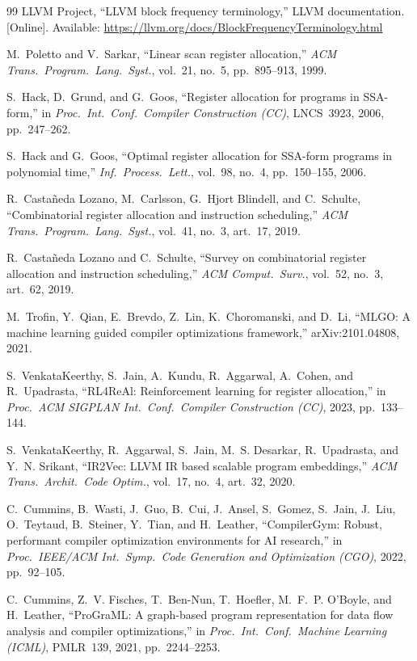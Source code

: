 \documentclass{ieeeaccess}
\begin{document}
\begin{thebibliography}{99}
LLVM Project, ``LLVM block frequency terminology,'' LLVM documentation.
[Online]. Available:
\url{https://llvm.org/docs/BlockFrequencyTerminology.html}

M.~Poletto and V.~Sarkar, ``Linear scan register allocation,''
\emph{ACM Trans.\ Program.\ Lang.\ Syst.}, vol.~21, no.~5,
pp.~895--913, 1999.

S.~Hack, D.~Grund, and G.~Goos, ``Register allocation for programs in
SSA-form,'' in \emph{Proc.\ Int.\ Conf.\ Compiler Construction (CC)},
LNCS~3923, 2006, pp.~247--262.

S.~Hack and G.~Goos, ``Optimal register allocation for SSA-form
programs in polynomial time,'' \emph{Inf.\ Process.\ Lett.}, vol.~98,
no.~4, pp.~150--155, 2006.

R.~Castañeda Lozano, M.~Carlsson, G.~Hjort Blindell, and C.~Schulte,
``Combinatorial register allocation and instruction scheduling,''
\emph{ACM Trans.\ Program.\ Lang.\ Syst.}, vol.~41, no.~3, art.~17,
2019.

R.~Castañeda Lozano and C.~Schulte, ``Survey on combinatorial register
allocation and instruction scheduling,'' \emph{ACM Comput.\ Surv.},
vol.~52, no.~3, art.~62, 2019.

M.~Trofin, Y.~Qian, E.~Brevdo, Z.~Lin, K.~Choromanski, and D.~Li,
``MLGO: A machine learning guided compiler optimizations framework,''
arXiv:2101.04808, 2021.

S.~VenkataKeerthy, S.~Jain, A.~Kundu, R.~Aggarwal, A.~Cohen, and
R.~Upadrasta, ``RL4ReAl: Reinforcement learning for register
allocation,'' in \emph{Proc.\ ACM SIGPLAN Int.\ Conf.\ Compiler
Construction (CC)}, 2023, pp.~133--144.

S.~VenkataKeerthy, R.~Aggarwal, S.~Jain, M.~S. Desarkar, R.~Upadrasta,
and Y.~N. Srikant, ``IR2Vec: LLVM IR based scalable program
embeddings,'' \emph{ACM Trans.\ Archit.\ Code Optim.}, vol.~17, no.~4,
art.~32, 2020.

C.~Cummins, B.~Wasti, J.~Guo, B.~Cui, J.~Ansel, S.~Gomez, S.~Jain,
J.~Liu, O.~Teytaud, B.~Steiner, Y.~Tian, and H.~Leather, ``CompilerGym:
Robust, performant compiler optimization environments for AI
research,'' in \emph{Proc.\ IEEE/ACM Int.\ Symp.\ Code Generation and
Optimization (CGO)}, 2022, pp.~92--105.

C.~Cummins, Z.~V. Fisches, T.~Ben-Nun, T.~Hoefler, M.~F.~P. O'Boyle,
and H.~Leather, ``ProGraML: A graph-based program representation for
data flow analysis and compiler optimizations,'' in \emph{Proc.\ Int.\
Conf.\ Machine Learning (ICML)}, PMLR~139, 2021, pp.~2244--2253.


\end{thebibliography}
\end{document}
